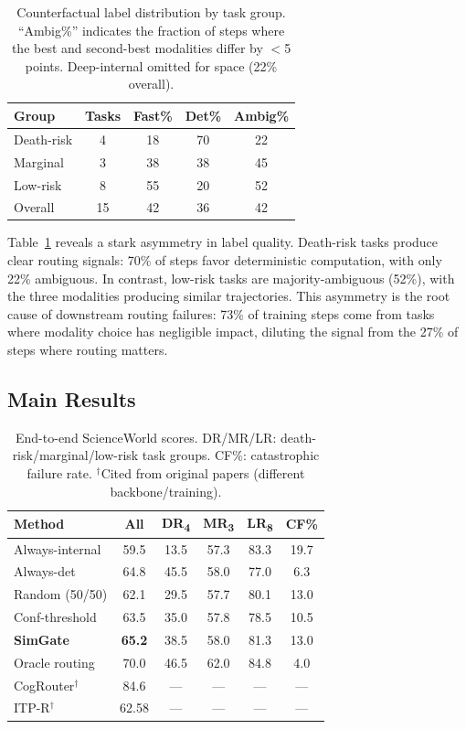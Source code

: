 \documentclass[11pt,a4paper]{article}
\begin{document}
\begin{table}[t]
\centering
\small
\begin{tabular}{lcccc}
\toprule
\textbf{Group} & \textbf{Tasks} & \textbf{Fast\%} & \textbf{Det\%} & \textbf{Ambig\%} \\
\midrule
Death-risk & 4 & 18 & 70 & 22 \\
Marginal & 3 & 38 & 38 & 45 \\
Low-risk & 8 & 55 & 20 & 52 \\
\midrule
Overall & 15 & 42 & 36 & 42 \\
\bottomrule
\end{tabular}
\caption{Counterfactual label distribution by task group. ``Ambig\%'' indicates the fraction of steps where the best and second-best modalities differ by $<$5 points. Deep-internal omitted for space (22\% overall).}
\label{tab:labels}
\end{table}

Table~\ref{tab:labels} reveals a stark asymmetry in label quality. Death-risk tasks produce clear routing signals: 70\% of steps favor deterministic computation, with only 22\% ambiguous. In contrast, low-risk tasks are majority-ambiguous (52\%), with the three modalities producing similar trajectories. This asymmetry is the root cause of downstream routing failures: 73\% of training steps come from tasks where modality choice has negligible impact, diluting the signal from the 27\% of steps where routing matters.

\subsection{Main Results}

\begin{table}[t]
\centering
\small
\begin{tabular}{lccccc}
\toprule
\textbf{Method} & \textbf{All} & \textbf{DR\textsubscript{4}} & \textbf{MR\textsubscript{3}} & \textbf{LR\textsubscript{8}} & \textbf{CF\%} \\
\midrule
Always-internal & 59.5 & 13.5 & 57.3 & 83.3 & 19.7 \\
Always-det & 64.8 & 45.5 & 58.0 & 77.0 & 6.3 \\
Random (50/50) & 62.1 & 29.5 & 57.7 & 80.1 & 13.0 \\
Conf-threshold & 63.5 & 35.0 & 57.8 & 78.5 & 10.5 \\
\textbf{SimGate} & \textbf{65.2} & 38.5 & 58.0 & 81.3 & 13.0 \\
Oracle routing & 70.0 & 46.5 & 62.0 & 84.8 & 4.0 \\
\midrule
CogRouter$^\dagger$ & 84.6 & --- & --- & --- & --- \\
ITP-R$^\dagger$ & 62.58 & --- & --- & --- & --- \\
\bottomrule
\end{tabular}
\caption{End-to-end ScienceWorld scores. DR/MR/LR: death-risk/marginal/low-risk task groups. CF\%: catastrophic failure rate. $^\dagger$Cited from original papers (different backbone/training).}
\label{tab:main}
\end{table}
\end{document}
